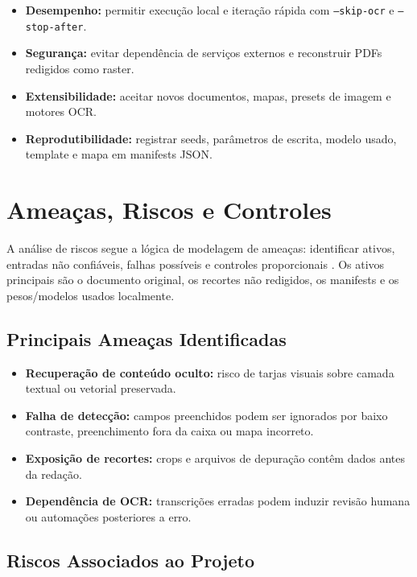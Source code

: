 \documentclass[12pt,a4paper]{article}
\begin{document}
\begin{itemize}
    \item \textbf{Desempenho:} permitir execução local e iteração rápida com \texttt{--skip-ocr} e \texttt{--stop-after}.
    \item \textbf{Segurança:} evitar dependência de serviços externos e reconstruir PDFs redigidos como raster.
    \item \textbf{Extensibilidade:} aceitar novos documentos, mapas, presets de imagem e motores OCR.
    \item \textbf{Reprodutibilidade:} registrar seeds, parâmetros de escrita, modelo usado, template e mapa em manifests JSON.
\end{itemize}

\section{Ameaças, Riscos e Controles}
\label{sec:threat-model}

A análise de riscos segue a lógica de modelagem de ameaças: identificar ativos, entradas não confiáveis, falhas possíveis e controles proporcionais \cite{shostack2014threat}. Os ativos principais são o documento original, os recortes não redigidos, os manifests e os pesos/modelos usados localmente.

\subsection{Principais Ameaças Identificadas}

\begin{itemize}
    \item \textbf{Recuperação de conteúdo oculto:} risco de tarjas visuais sobre camada textual ou vetorial preservada.
    \item \textbf{Falha de detecção:} campos preenchidos podem ser ignorados por baixo contraste, preenchimento fora da caixa ou mapa incorreto.
    \item \textbf{Exposição de recortes:} crops e arquivos de depuração contêm dados antes da redação.
    \item \textbf{Dependência de OCR:} transcrições erradas podem induzir revisão humana ou automações posteriores a erro.
\end{itemize}

\subsection{Riscos Associados ao Projeto}
\end{document}
